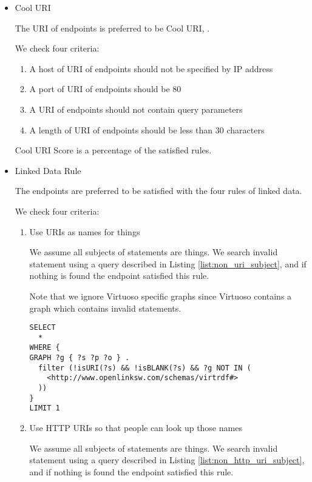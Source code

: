 \documentclass[11pt,a4paper]{article}
\begin{document}
  \begin{itemize}

    \item Cool URI

    The URI of endpoints is preferred to be Cool URI\cite{Leo:08:CoolUri}, \cite{Leigh:12:LinkedDataPatterns}.

    We check four criteria:
    \begin{enumerate}
      \item A host of URI of endpoints should not be specified by IP address
      \item A port of URI of endpoints should be 80
      \item A URI of endpoints should not contain query parameters
      \item A length of URI of endpoints should be less than 30 characters
    \end{enumerate}

    Cool URI Score is a percentage of the satisfied rules.

    \item Linked Data Rule

    The endpoints are preferred to be satisfied with the four rules of linked data\cite{Tim:06:LinkedDataRules}.

    We check four criteria:
    \begin{enumerate}
      \item Use URIs as names for things

      We assume all subjects of statements are things. We search invalid statement using a query described in Listing \ref{list:non_uri_subject}, and if nothing is found the endpoint satisfied this rule.

      Note that we ignore Virtuoso specific graphs since Virtuoso contains a graph which contains invalid statements.

      \begin{lstlisting}[basicstyle=\ttfamily\footnotesize,breaklines=true,frame=single,caption=A Query for searching non-URI subjects,label=list:non_uri_subject]
SELECT
  *
WHERE {
GRAPH ?g { ?s ?p ?o } .
  filter (!isURI(?s) && !isBLANK(?s) && ?g NOT IN (
    <http://www.openlinksw.com/schemas/virtrdf#>
  ))
}
LIMIT 1
      \end{lstlisting}

      \item Use HTTP URIs so that people can look up those names

      We assume all subjects of statements are things. We search invalid statement using a query described in Listing \ref{list:non_http_uri_subject}, and if nothing is found the endpoint satisfied this rule.


\end{enumerate}
\end{itemize}
\end{document}
